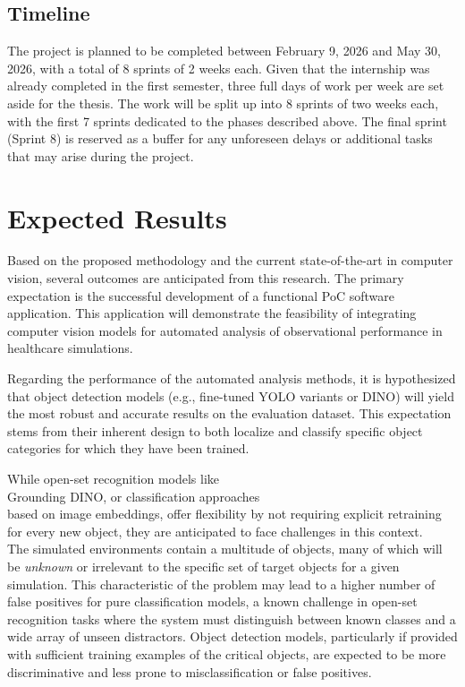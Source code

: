 \documentclass[english]{hogent-article}
\begin{document}
\subsection{Timeline}

The project is planned to be completed between February 9, 2026 and May 30, 2026, with a total of 8 sprints of 2 weeks each.
Given that the internship was already completed in the first semester, three full days of work per week are set aside for the thesis.
The work will be split up into 8 sprints of two weeks each, with the first 7 sprints dedicated to the phases described above.
The final sprint (Sprint 8) is reserved as a buffer for any unforeseen delays or additional tasks that may arise during the project.

\section{Expected Results}
\label{sec:expected-results}

Based on the proposed methodology and the current state-of-the-art in computer vision, several outcomes are anticipated from this research.
The primary expectation is the successful development of a functional PoC software application. 
This application will demonstrate the feasibility of integrating computer vision models for automated analysis of observational performance in healthcare simulations.

Regarding the performance of the automated analysis methods, it is hypothesized that object detection models (e.g., fine-tuned YOLO variants or DINO) will yield the most robust and accurate results on the evaluation dataset.
This expectation stems from their inherent design to both localize and classify specific object categories for which they have been trained.

While open-set recognition models like\\ Grounding DINO, or classification approaches\\ based on image embeddings, offer flexibility by not requiring explicit retraining for every new object, they are anticipated to face challenges in this context.\\
The simulated environments contain a multitude of objects, many of which will be \textit{unknown} or irrelevant to the specific set of target objects for a given simulation.
This characteristic of the problem may lead to a higher number of false positives for pure classification models, a known challenge in open-set recognition tasks where the system must distinguish between known classes and a wide array of unseen distractors.
Object detection models, particularly if provided with sufficient training examples of the critical objects, are expected to be more discriminative and less prone to misclassification or false positives.
\end{document}
